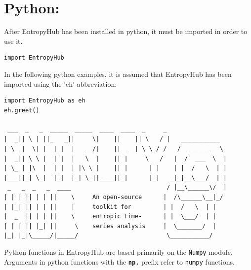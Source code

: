 \documentclass[12pt, a4paper, titlepage, openany]{book}
\begin{document}
\newpage
\section{Python:}
\noindent After EntropyHub has been installed in python, it must be imported in order to use it.
\begin{verbatim}
import EntropyHub
\end{verbatim}
\noindent In the following python examples, it is assumed that EntropyHub has been imported using the 'eh' abbreviation:
\begin{verbatim}
import EntropyHub as eh
eh.greet()

 ___  _   _  _____  _____  ____  ____  _     _          
|  _|| \ | ||_   _||     \|    ||    || \   / |   ___________ 
| \_ |  \| |  | |  |   __/|    ||  __| \ \_/ /   /  _______  \
|  _|| \ \ |  | |  |   \  |    || |     \   /   |  /  ___  \  |
| \_ | |\  |  | |  | |\ \ |    || |      | |    | |  /   \  | | 
|___||_| \_|  |_|  |_| \_||____||_|      |_|   _|_|__\___/  | | 
 _   _  _   _  ____                           / |__\______\/  | 
| | | || | | ||    \     An open-source      |  /\______\__|_/ 
| |_| || | | ||    |     toolkit for         | |  /   \  | | 
|  _  || | | ||    \     entropic time-      | |  \___/  | |          
| | | || |_| ||     \    series analysis     |  \_______/  |
|_| |_|\_____/|_____/                         \___________/ 

\end{verbatim}


\begin{tcolorbox}[sharp corners, colback=ehone!30, colframe=ehone, title=\textbf{NOTE}]
Python functions in EntropyHub are based primarily on the \texttt{Numpy} module.\\ Arguments in python functions with the \textbf{\texttt{np.}} prefix refer to \texttt{numpy} functions.  
\end{tcolorbox}


\newpage
\end{document}
